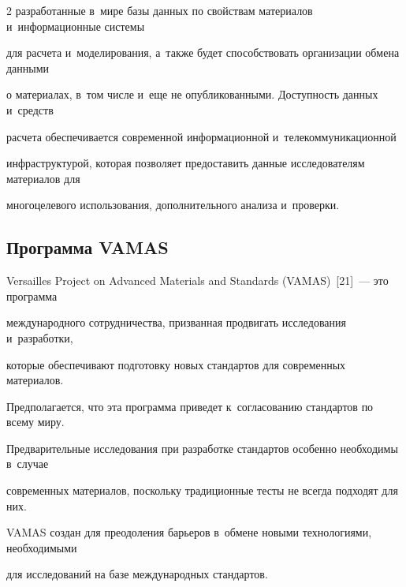 \begin{multicols}{2}
разработанные в~мире базы данных по свойствам материалов и~информационные системы 


для расчета и~моделирования, а~также будет способствовать организации обмена данными 


о материалах, в~том числе и~еще не опубликованными. Доступность данных и~средств 


расчета обеспечивается современной информационной и~телекоммуникационной 


инфраструктурой, которая позволяет предоставить данные исследователям материалов для 


многоцелевого использования, дополнительного анализа и~проверки.





\vspace*{-3pt}





\subsection{Программа VAMAS}





\vspace*{-1pt}





  Versailles Project on Advanced Materials and Standards (VAMAS)~[21]~--- это программа 


международного сотрудничества, призванная продвигать исследования и~разработки, 


которые обеспечивают подготовку новых стандартов для современных материалов. 


Предполагается, что эта программа приведет к~согласованию стандартов по всему миру. 


Предварительные исследования при разработке стандартов особенно необходимы в~случае 


современных материалов, поскольку традиционные тес\-ты не всегда подходят для них. 


VAMAS создан для преодоления барьеров в~обмене новыми технологиями, необходимыми 


для исследований на базе международных стандартов.





\vspace*{-3pt}



\end{multicols}
